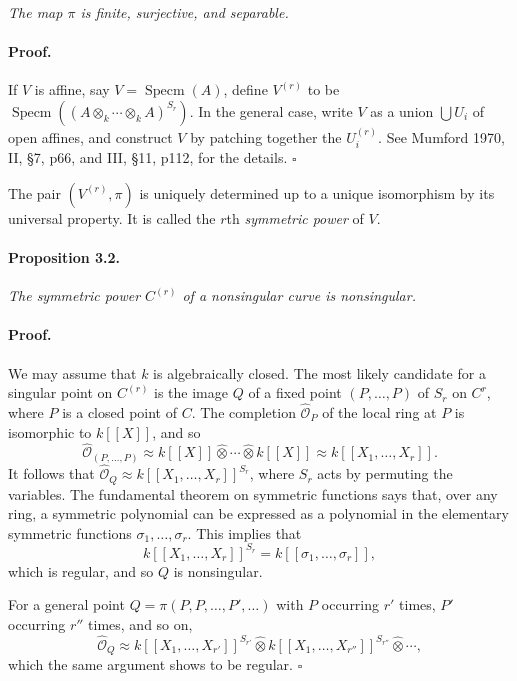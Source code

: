 \textit{The map $\pi$ is finite, surjective, and separable.}

\paragraph{Proof.}
If $V$ is affine, say $V = \operatorname{Specm}(A)$, define $V^{(r)}$ to be
$\operatorname{Specm}((A \otimes_k \cdots \otimes_k A)^{S_r})$. In the
general case, write $V$ as a union $\bigcup U_i$ of open affines, and construct
$V$ by patching together the $U_i^{(r)}$. See Mumford 1970, II, \S 7, p66,
and III, \S 11, p112, for the details. \hfill $\square$

The pair $(V^{(r)}, \pi)$ is uniquely determined up to a unique isomorphism
by its universal property. It is called the $r$th \textit{symmetric power} of
$V$.

\paragraph{Proposition 3.2.}
\textit{The symmetric power $C^{(r)}$ of a nonsingular curve is nonsingular.}

\paragraph{Proof.}
We may assume that $k$ is algebraically closed. The most likely candidate for
a singular point on $C^{(r)}$ is the image $Q$ of a fixed point
$(P, \ldots, P)$ of $S_r$ on $C^r$, where $P$ is a closed point of $C$. The
completion $\widehat{\mathcal{O}}_P$ of the local ring at $P$ is isomorphic to
$k[[X]]$, and so
\[
  \widehat{\mathcal{O}}_{(P,\ldots,P)}
  \approx k[[X]] \widehat{\otimes} \cdots \widehat{\otimes} k[[X]]
  \approx k[[X_1, \ldots, X_r]].
\]
It follows that
$\widehat{\mathcal{O}}_Q \approx k[[X_1, \ldots, X_r]]^{S_r}$, where $S_r$
acts by permuting the variables. The fundamental theorem on symmetric
functions says that, over any ring, a symmetric polynomial can be expressed
as a polynomial in the elementary symmetric functions
$\sigma_1, \ldots, \sigma_r$. This implies that
\[
  k[[X_1, \ldots, X_r]]^{S_r} = k[[\sigma_1, \ldots, \sigma_r]],
\]
which is regular, and so $Q$ is nonsingular.

For a general point $Q = \pi(P, P, \ldots, P', \ldots)$ with $P$ occurring
$r'$ times, $P'$ occurring $r''$ times, and so on,
\[
  \widehat{\mathcal{O}}_Q
  \approx k[[X_1, \ldots, X_{r'}]]^{S_{r'}} \widehat{\otimes}
  k[[X_1, \ldots, X_{r''}]]^{S_{r''}} \widehat{\otimes} \cdots,
\]
which the same argument shows to be regular. \hfill $\square$
